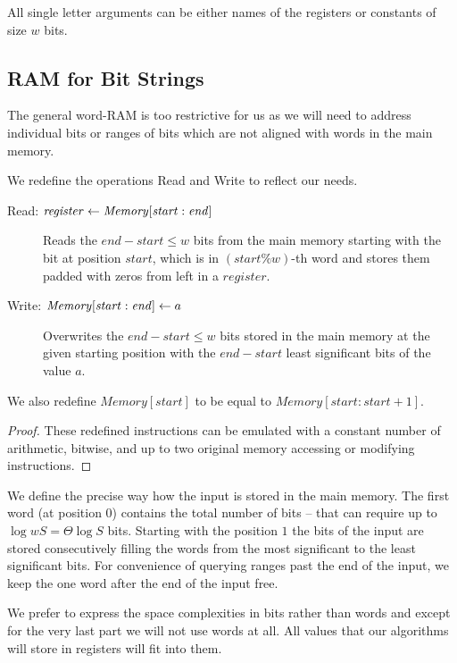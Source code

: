 All single letter arguments can be either names of the registers or constants of size $w$ bits.

\subsection{RAM for Bit Strings}

The general word-RAM is too restrictive for us as we will need to address individual bits or ranges of bits which are not aligned with words in the main memory.

\begin{lemma}
	We redefine the operations Read and Write to reflect our needs.
	
	\begin{description}
		\item[Read: $\mathit{register} \gets \mathit{Memory}[\mathit{start}:\mathit{end}\char93$]
		Reads the $\mathit{end} - \mathit{start} \le w$ bits from the main memory starting with the bit at position $\mathit{start}$, which is in $(\mathit{start} \% w)$-th word and stores them padded with zeros from left in a $register$.
		\item[Write: $\mathit{Memory}[\mathit{start}:\mathit{end}\char93 \gets a$]
		Overwrites the $\mathit{end} - \mathit{start} \le w$ bits stored in the main memory at the given starting position with the $\mathit{end} - \mathit{start}$ least significant bits of the value $a$.
	\end{description}
	
	We also redefine $\mathit{Memory}[\mathit{start}]$ to be equal to $\mathit{Memory}[\mathit{start}:\mathit{start} + 1]$.
\end{lemma}
\begin{proof}
	These redefined instructions can be emulated with a constant number of arithmetic, bitwise, and up to two original memory accessing or modifying instructions.
\end{proof}

We define the precise way how the input is stored in the main memory.
The first word (at position $0$) contains the total number of bits -- that can require up to $\log w S = \Theta \log S$ bits.
Starting with the position $1$ the bits of the input are stored consecutively filling the words from the most significant to the least significant bits.
For convenience of querying ranges past the end of the input, we keep the one word after the end of the input free.

We prefer to express the space complexities in bits rather than words and except for the very last part we will not use words at all.
All values that our algorithms will store in registers will fit into them.

